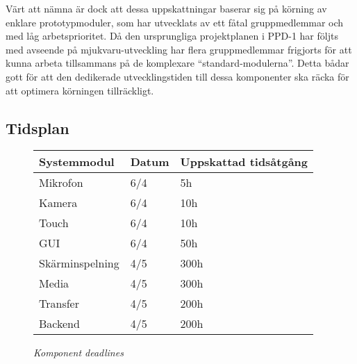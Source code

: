 Värt att nämna är dock att dessa uppskattningar baserar sig på körning av enklare prototypmoduler, som har utvecklats av ett fåtal gruppmedlemmar och med låg arbetsprioritet. Då den ursprungliga projektplanen i PPD-1 har följts med avseende på mjukvaru-utveckling har flera gruppmedlemmar frigjorts för att kunna arbeta tillsammans på de komplexare ``standard-modulerna''. Detta bådar gott för att den dedikerade utvecklingstiden till dessa komponenter ska räcka för att optimera körningen tillräckligt.

\subsection{Tidsplan}
\begin{figure}[H]
\centering
\begin{tabular}{ | l | l | l |}
  \hline
  \textbf{Systemmodul} & \textbf{Datum} & \textbf{Uppskattad tidsåtgång} \\ \hline
  Mikrofon & 6/4 & 5h \\ \hline
  Kamera & 6/4 & 10h  \\ \hline
  Touch & 6/4 & 10h \\ \hline
  GUI & 6/4 & 50h \\ \hline
  Skärminspelning & 4/5 & 300h \\ \hline
  Media & 4/5 & 300h \\ \hline
  Transfer & 4/5 & 200h \\ \hline
  Backend & 4/5 & 200h \\ \hline
\end{tabular}
\caption*{\textit{Komponent deadlines}}
\end{figure}
